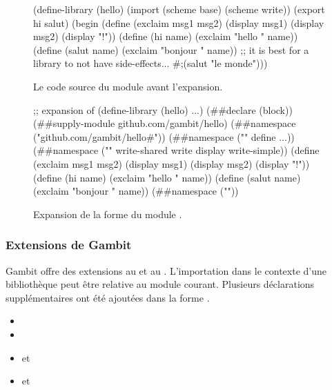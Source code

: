 \begin{figure}[ht]
  \centering
\begin{mplisting}{0.9}
(define-library (hello)
  (import (scheme base) (scheme write))
  (export hi salut)
  (begin
    (define (exclaim msg1 msg2)
      (display msg1)
      (display msg2)
      (display "!\n"))
    (define (hi name) (exclaim "hello " name))
    (define (salut name) (exclaim "bonjour " name))
    ;; it is best for a library to not have side-effects...
    #;(salut "le monde")))
\end{mplisting}
  \caption{Le code source du module
     avant l'expansion.}
  \label{fig:define-library->expand}
\end{figure}
  \vspace*{4ex}
\begin{figure}[ht]
  \centering
  \begin{mplisting}{0.9}
;; expansion of (define-library (hello) ...)
(##declare (block))
(##supply-module github.com/gambit/hello)
(##namespace ("github.com/gambit/hello#"))
(##namespace ("" define ...))
(##namespace ("" write-shared write display write-simple))
(define (exclaim msg1 msg2)
    (display msg1) (display msg2) (display "!\n"))
(define (hi name) (exclaim "hello " name))
(define (salut name) (exclaim "bonjour " name))
(##namespace (""))
\end{mplisting}
  \caption{Expansion de la forme 
    du module .}
  \label{fig:define-library->expand-after}
\end{figure}

\subsubsection{Extensions de Gambit}

Gambit offre des extensions au  et au .
L'importation dans le contexte d'une bibliothèque peut être relative au module
courant. Plusieurs déclarations supplémentaires ont été ajoutées dans la forme
.

\begin{itemize}
  \item {}
  \item {}
  \item {} et 
  \item {} et 
\end{itemize}


